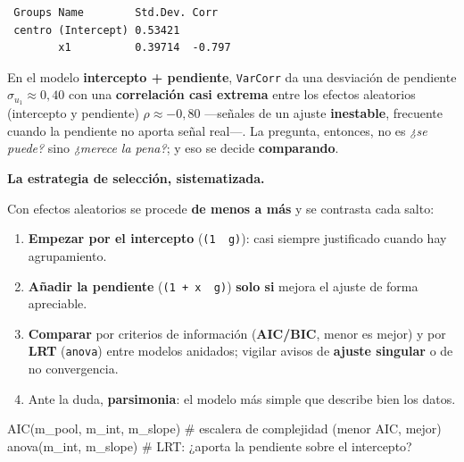 \documentclass[
  letterpaper,
  DIV=11,
  numbers=noendperiod]{scrartcl}
\newenvironment{Shaded}{\begin{snugshade}}{\end{snugshade}}
\newcommand{\CommentTok}[1]{\textcolor[rgb]{0.37,0.37,0.37}{#1}}
\newcommand{\FunctionTok}[1]{\textcolor[rgb]{0.28,0.35,0.67}{#1}}
\newcommand{\NormalTok}[1]{\textcolor[rgb]{0.00,0.23,0.31}{#1}}
\providecommand{\tightlist}{%
  \setlength{\itemsep}{0pt}\setlength{\parskip}{0pt}}\usepackage{longtable,booktabs,array}
\begin{document}
\begin{verbatim}
 Groups Name        Std.Dev. Corr   
 centro (Intercept) 0.53421         
        x1          0.39714  -0.797 
\end{verbatim}

En el modelo \textbf{intercepto + pendiente}, \texttt{VarCorr} da una
desviación de pendiente \(\hat\sigma_{u_1}\approx0{,}40\) con una
\textbf{correlación casi extrema} entre los efectos aleatorios
(intercepto y pendiente) \(\rho\approx-0{,}80\) ---señales de un ajuste
\textbf{inestable}, frecuente cuando la pendiente no aporta señal
real---. La pregunta, entonces, no es \emph{¿se puede?} sino
\emph{¿merece la pena?}; y eso se decide \textbf{comparando}.

\textbf{La estrategia de selección, sistematizada.}

Con efectos aleatorios se procede \textbf{de menos a más} y se contrasta
cada salto:

\begin{enumerate}
\def\labelenumi{\arabic{enumi}.}
\tightlist
\item
  \textbf{Empezar por el intercepto} (\texttt{(1\ \textbar{}\ g)}): casi
  siempre justificado cuando hay agrupamiento.
\item
  \textbf{Añadir la pendiente} (\texttt{(1\ +\ x\ \textbar{}\ g)})
  \textbf{solo si} mejora el ajuste de forma apreciable.
\item
  \textbf{Comparar} por criterios de información (\textbf{AIC/BIC},
  menor es mejor) y por \textbf{LRT} (\texttt{anova}) entre modelos
  anidados; vigilar avisos de \textbf{ajuste singular} o de no
  convergencia.
\item
  Ante la duda, \textbf{parsimonia}: el modelo más simple que describe
  bien los datos.
\end{enumerate}

\begin{tcolorbox}[enhanced jigsaw, breakable, colframe=quarto-callout-tip-color-frame, left=2mm, arc=.35mm, colbacktitle=quarto-callout-tip-color!10!white, toprule=.15mm, colback=white, coltitle=black, rightrule=.15mm, opacitybacktitle=0.6, title=\textcolor{quarto-callout-tip-color}{\faLightbulb}\hspace{0.5em}{🔧 En R. Comparar y elegir}, titlerule=0mm, toptitle=1mm, bottomtitle=1mm, leftrule=.75mm, bottomrule=.15mm, opacityback=0]

\begin{Shaded}
\begin{Highlighting}[]
\FunctionTok{AIC}\NormalTok{(m\_pool, m\_int, m\_slope)   }\CommentTok{\# escalera de complejidad (menor AIC, mejor)}
\FunctionTok{anova}\NormalTok{(m\_int, m\_slope)          }\CommentTok{\# LRT: ¿aporta la pendiente sobre el intercepto?}
\end{Highlighting}
\end{Shaded}

\end{tcolorbox}
\end{document}
